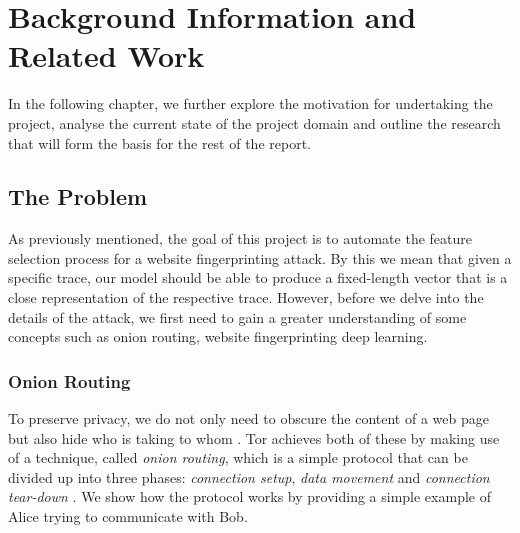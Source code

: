 \chapter{Background Information and Related Work}

In the following chapter, we further explore the motivation for undertaking the project,
analyse the current state of the project domain and outline the research that will form the basis for the rest of the report.

\section{The Problem}

As previously mentioned, the goal of this project is to automate the feature selection process for a website fingerprinting attack.
By this we mean that given a specific trace, our model should be able to produce a fixed-length vector that is a close representation of the respective trace.
However, before we delve into the details of the attack, we first need to gain a greater understanding of some concepts such as
onion routing, website fingerprinting deep learning.

\subsection{Onion Routing}

To preserve privacy, we do not only need to obscure the content of a web page but also hide who is taking to whom \cite{goldschlag1999onion}.
Tor achieves both of these by making use of a technique, called \textit{onion routing}, which is a simple protocol that can be divided up into three phases:
\textit{connection setup}, \textit{data movement} and \textit{connection tear-down} \cite{goldschlag1999onion}.
We show how the protocol works by providing a simple example of Alice trying to communicate with Bob.

